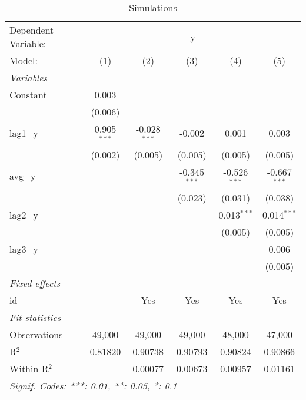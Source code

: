 
\begin{table}[htbp]
   \caption{\label{tab:n_voyage} Simulations}
   \centering
   \begin{tabular}{lccccc}
      \tabularnewline \midrule \midrule
      Dependent Variable: & \multicolumn{5}{c}{y}\\
      Model:       & (1)           & (2)            & (3)            & (4)            & (5)\\  
      \midrule
      \emph{Variables}\\
      Constant     & 0.003         &                &                &                &   \\   
                   & (0.006)       &                &                &                &   \\   
      lag1\_y      & 0.905$^{***}$ & -0.028$^{***}$ & -0.002         & 0.001          & 0.003\\   
                   & (0.002)       & (0.005)        & (0.005)        & (0.005)        & (0.005)\\   
      avg\_y       &               &                & -0.345$^{***}$ & -0.526$^{***}$ & -0.667$^{***}$\\   
                   &               &                & (0.023)        & (0.031)        & (0.038)\\   
      lag2\_y      &               &                &                & 0.013$^{***}$  & 0.014$^{***}$\\   
                   &               &                &                & (0.005)        & (0.005)\\   
      lag3\_y      &               &                &                &                & 0.006\\   
                   &               &                &                &                & (0.005)\\   
      \midrule
      \emph{Fixed-effects}\\
      id           &               & Yes            & Yes            & Yes            & Yes\\  
      \midrule
      \emph{Fit statistics}\\
      Observations & 49,000        & 49,000         & 49,000         & 48,000         & 47,000\\  
      R$^2$        & 0.81820       & 0.90738        & 0.90793        & 0.90824        & 0.90866\\  
      Within R$^2$ &               & 0.00077        & 0.00673        & 0.00957        & 0.01161\\  
      \midrule \midrule
      \multicolumn{6}{l}{\emph{Signif. Codes: ***: 0.01, **: 0.05, *: 0.1}}\\
   \end{tabular}
\end{table}



